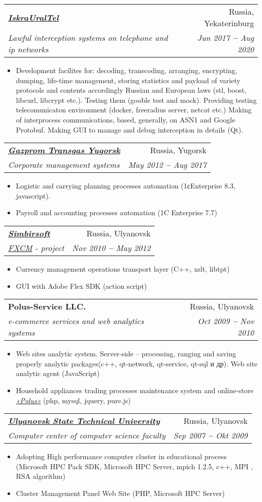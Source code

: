 \documentclass[letterpaper,11pt]{article}
\makeatletter
\newcommand{\resumeItem}[1]{
  \item\small{
    {#1 \vspace{-2pt}}
  }
}
\newcommand{\resumeSubheading}[4]{
  \vspace{-2pt}\item
    \begin{tabular*}{0.97\textwidth}[t]{l@{\extracolsep{\fill}}r}
      \textbf{#1} & #2 \\
      \textit{\small#3} & \textit{\small #4} \\
    \end{tabular*}\vspace{-7pt}
}
\newcommand{\resumeItemListStart}{\begin{itemize}}
\newcommand{\resumeItemListEnd}{\end{itemize}\vspace{-5pt}}
\makeatother
\begin{document}
    \resumeSubheading
      {\emph{\href{https://iskrauraltel.ru/ru/}{\color{blue}IskraUralTel}}}{Russia, Yekaterinburg}
      {Lawful interception systems on telephone and ip networks}{Jun 2017 \textbf{--} Aug 2020}
        \resumeItemListStart
            \resumeItem{ Development facilites for: decoding, transcoding, arranging, encrypting, dumping, life-time management, storing statistics and payload of variety protocols and contents accordingly Russian and European laws (stl, boost, libcurl, libcrypt etc.). Testing them (gooble test and mock). Providing testing telecomunicaton environment (docker, freeradius server, netcat etc.) Making of interprocess communications, based, generally, on ASN1 and Google Protobuf. Making GUI to manage and debug interception in details (Qt).}
        \resumeItemListEnd

    \resumeSubheading
      {\emph{\href{https://yugorsk-tr.gazprom.ru/}{\color{blue}Gazprom Transgas Yugorsk}}}{Russia, Yugorsk}
      {Corporate management systems}{May 2012 \textbf{--} Aug 2017}
        \resumeItemListStart
            \resumeItem{ Logistic and carrying planning processes automation (1сEnterprise 8.3, javascript). }
            \resumeItem{ Payroll and accounting processes automation (1C Enterprise 7.7) }
        \resumeItemListEnd


    \resumeSubheading
      {\emph{\href{https://simbirsoft.com}{\color{blue}Simbirsoft}}}{Russia, Ulyanovsk}
      {\emph{\href{https://www.fxcm.com/markets/}{\color{blue}FXCM}} - project}{Nov 2010 \textbf{--} May 2012}
        \resumeItemListStart
        \resumeItem{ Currency management operations transport layer (C++, xslt, libtpt) }
        \resumeItem{ GUI with Adobe Flex SDK (action script) }
        \resumeItemListEnd


    \resumeSubheading
      {Polus-Service LLC.}{Russia, Ulyanovsk}
      {e-commerce services and web analytics systems}{Oct 2009 \textbf{--} Nov 2010}
        \resumeItemListStart
            \resumeItem{ Web sites analytic system. Server-side – processing, ranging and saving properly analytic packages(c++, qt-network, qt-service, qt-sql и др). Web site analytic agent (JavaScript) }
            \resumeItem{ Household appliances trading processes maintenance system and online-store \emph{\href{https://polus73.ru/}{\color{blue}«Polus»}} (php, mysql, jquery, pure.js) }
        \resumeItemListEnd

    \resumeSubheading
      {\emph{\href{https://ulstu.ru/}{\color{blue} Ulyanovsk State Technical University}}}{Russia, Ulyanovsk}
      {Computer center of computer science faculty}{Sep 2007 \textbf{--} Okt 2009}
        \resumeItemListStart
            \resumeItem{ Adopting High performance computer cluster in educational process (Microsoft HPC Pack SDK, Microsoft HPC Server, mpich 1.2.5, c++, MPI , RSA algorithm)}
            \resumeItem{ Cluster Management Panel Web Site (PHP, Microsoft HPC Server) }
        \resumeItemListEnd
\end{document}
